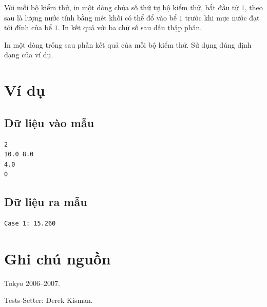 \documentclass[11pt]{article}
\begin{document}
Với mỗi bộ kiểm thử, in một dòng chứa số thứ tự bộ kiểm thử, bắt đầu từ $1$,
theo sau là lượng nước tính bằng mét khối có thể đổ vào bể $1$ trước khi mực
nước đạt tới đỉnh của bể $1$. In kết quả với ba chữ số sau dấu thập phân.

In một dòng trống sau phần kết quả của mỗi bộ kiểm thử. Sử dụng đúng định
dạng của ví dụ.

\section*{Ví dụ}

\subsection*{Dữ liệu vào mẫu}

\begin{verbatim}
2
10.0 8.0
4.0
0
\end{verbatim}

\subsection*{Dữ liệu ra mẫu}

\begin{verbatim}
Case 1: 15.260
\end{verbatim}

\section*{Ghi chú nguồn}

Tokyo 2006--2007.

Tests-Setter: Derek Kisman.
\end{document}
